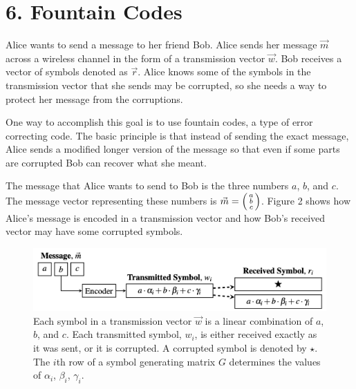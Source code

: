 \documentclass[11pt]{article}
\begin{document}
     

\newpage

\section*{6. Fountain Codes}

    Alice wants to send a message to her friend Bob. Alice sends her message $\vec m$ across a wireless channel in the form of a transmission vector $\vec w$. Bob receives a vector of symbols denoted as $\vec r$. Alice knows some of the symbols in the transmission vector that she sends may be corrupted, so she needs
    a way to protect her message from the corruptions.
    \par
    One way to accomplish this goal is to use fountain codes, a type of error correcting code. The basic principle is that instead of sending the exact message, Alice sends a modified longer version of the message so that even if some parts are corrupted Bob can recover what she meant.
    
    The message that Alice wants to send to Bob is the three numbers $a$, $b$, and $c$. The message vector representing these numbers is 
    $
        \vec m = \begin{psmallmatrix}
                    a \\
                    b \\
                    c
                \end{psmallmatrix}
    $. Figure 2 shows how Alice’s message is encoded in a transmission vector and how Bob’s received vector may have some corrupted symbols.
    \begin{figure}[h]
        \centering
        \includegraphics[scale=0.25]{encoder}
        \caption{Each symbol in a transmission vector $\vec w$ is a linear combination of $a$, $b$, and $c$. Each transmitted symbol, $w_i$, is either received exactly as it was sent, or it is corrupted. A corrupted symbol is denoted by $\star$. The $i$th row of a symbol generating matrix $G$ determines the values of $\alpha_i$, $\beta_i$, $\gamma_i$.}
    \end{figure}
    
\end{document}
